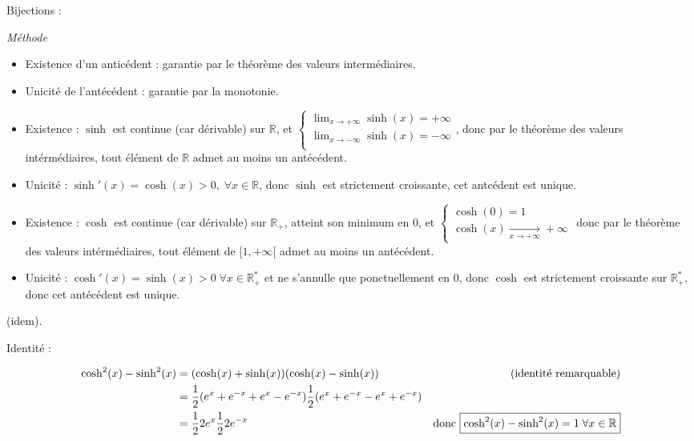 \documentclass[10pt,a4paper]{article}
\begin{document}
\q Bijections :

\emph{Méthode}
\begin{itemize}
 \item Existence d'un anticédent : garantie par le théorème des valeurs intermédiaires.
 \item Unicité de l'antécédent : garantie par la monotonie.
\end{itemize}

\bigskip
{}
\begin{itemize}
 \item Existence : $\sinh$ est continue (car dérivable) sur $\mathbb{R}$, et $\begin{cases} \lim_{x
 \to +\infty}\sinh(x) = +\infty\\
   \lim_{x \to -\infty}\sinh(x) = -\infty\\
  \end{cases}$, donc par le théorème des valeurs intérmédiaires, tout élément de $\mathbb{R}$ admet
  au moins un antécédent.
 \item Unicité : $\sinh'(x) = \cosh(x) > 0 , \; \forall x \in \mathbb{R}$, donc $\sinh$ est
 strictement croissante, cet antcédent est unique.
\end{itemize}

\bigskip
\fbox{$\cosh$ : bijection de $\mathbb{R}_+$ dans $[1, + \infty[$}
\begin{itemize}
 \item Existence : $\cosh$ est continue (car dérivable) sur $\mathbb{R}_+$, atteint son minimum en
 $0$, et $ \begin{cases} \cosh(0) = 1\\
\cosh(x) \xrightarrow[x \to +\infty]{} +\infty \end{cases}$ donc par le théorème des valeurs
 intérmédiaires, tout élément de $[1, + \infty[$ admet au moins un antécédent.
 \item Unicité : $\cosh'(x) = \sinh(x) > 0 \; \forall x \in \mathbb{R}_+^*$ et ne s'annulle que
 ponctuellement en $0$, donc $\cosh$ est strictement croissante sur $\mathbb{R}_+^*$, donc cet
 antécédent est unique.
\end{itemize}

\bigskip
\fbox{$\tanh$ : bijection de $\mathbb{R}$ dans $]-1,1[$} (idem).


\q Identité :

\begin{align*}
\cosh^2(x) - \sinh^2(x) & = (\cosh(x) + \sinh(x))(\cosh(x) - \sinh(x)) & \text{(identité remarquable)}\\
& = \frac{1}{2}(e^x + e^{-x} + e^x - e^{-x})\frac{1}{2}(e^x + e^{-x} - e^x + e^{-x})\\
& = \frac{1}{2}2 e^x \frac{1}{2}2e^{-x} & \text{donc \fbox{$\cosh^2(x) - \sinh^2(x) = 1 \; \forall x \in \mathbb{R}$}}
\end{align*}
\end{document}
